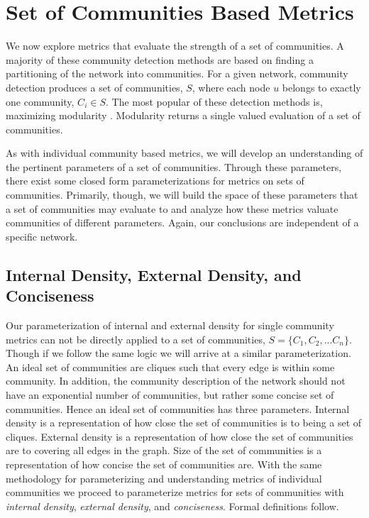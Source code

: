 \documentclass[phd,tocprelim]{cornell}
\begin{document}
\section{Set of Communities Based Metrics}

We now explore metrics that evaluate the strength of a set of communities.  A majority of these community detection methods are based on finding a partitioning of the network into communities.  For a given network, community detection produces a set of communities, $S$, where each node $u$ belongs to exactly one community, $C_i \in S$.  The most popular of these detection methods is, maximizing modularity \cite{}.  Modularity returns a single valued evaluation of a set of communities.

As with individual community based metrics, we will develop an understanding of the pertinent parameters of a set of communities.  Through these parameters, there exist some closed form parameterizations for metrics on sets of communities.  Primarily, though, we will build the space of these parameters that a set of communities may evaluate to and analyze how these metrics valuate communities of different parameters.  Again, our conclusions are independent of a specific network.


\subsection{Internal Density, External Density, and Conciseness}

Our parameterization of internal and external density for single community metrics can not be directly applied to a set of communities, $S = \{C_1,C_2,...C_n\}$. Though if we follow the same logic we will arrive at a similar parameterization. An ideal set of communities are cliques such that every edge is within some community. In addition, the community description of the network should not have an exponential number of communities, but rather some concise set of communities. Hence an ideal set of communities has three parameters. Internal density is a representation of how close the set of communities is to being a set of cliques. External density is a representation of how close the set of communities are to covering all edges in the graph. Size of the set of communities is a representation of how concise the set of communities are. With the same methodology for parameterizing and understanding metrics of individual communities we proceed to parameterize metrics for sets of communities with {\it internal density}, {\it external density}, and {\it conciseness}.  Formal definitions follow.
\end{document}
